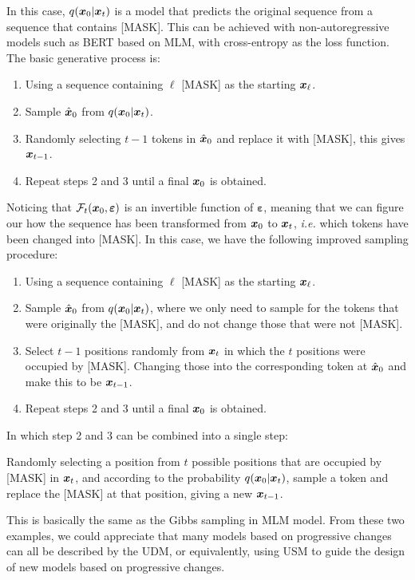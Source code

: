 In this case, $q(\bm{x}_0|\bm{x}_{t})$ is a model that predicts the original sequence from a sequence that contains [MASK]. This can be achieved with non-autoregressive models such as BERT based on MLM, with cross-entropy as the loss function. The basic generative process is:
\begin{myquote}
    \begin{enumerate}
        \item Using a sequence containing $\ell$ [MASK] as the starting $\bm{x}_\ell$.
        \item Sample $\hat{\bm{x}}_0$ from $q(\bm{x}_0|\bm{x}_{t})$.
        \item Randomly selecting $t-1$ tokens in $\hat{\bm{x}}_0$ and replace it with [MASK], this gives $\bm{x}_{t-1}$.
        \item Repeat steps 2 and 3 until a final $\bm{x}_0$ is obtained.
    \end{enumerate}
\end{myquote}

Noticing that $\mathcal{F}_{t}(\bm{x}_0,\bm{\varepsilon})$ is an invertible function of $\bm{\varepsilon}$, meaning that we can figure our how the sequence has been transformed from $\bm{x}_0$ to $\bm{x}_{t}$, \emph{i.e.} which tokens have been changed into [MASK]. In this case, we have the following improved sampling procedure:
\begin{myquote}
    \begin{enumerate}
        \item Using a sequence containing $\ell$ [MASK] as the starting $\bm{x}_\ell$.
        \item Sample $\hat{\bm{x}}_0$ from $q(\bm{x}_0|\bm{x}_{t})$, where we only need to sample for the tokens that were originally the [MASK], and do not change those that were not [MASK].
        \item Select $t-1$ positions randomly from $\bm{x}_{t}$ in which the $t$ positions were occupied by [MASK]. Changing those into the corresponding token at $\hat{\bm{x}}_0$ and make this to be $\bm{x}_{t-1}$.
        \item Repeat steps 2 and 3 until a final $\bm{x}_0$ is obtained.
    \end{enumerate}
\end{myquote}
In which step 2 and 3 can be combined into a single step:
\begin{myquote}
    Randomly selecting a position from $t$ possible positions that are occupied by [MASK] in $\bm{x}_{t}$, and according to the probability $q(\bm{x}_0|\bm{x}_{t})$, sample a token and replace the [MASK] at that position, giving a new $\bm{x}_{t-1}$.
\end{myquote}
This is basically the same as the Gibbs sampling in MLM model. From these two examples, we could appreciate that many models based on progressive changes can all be described by the UDM, or equivalently, using USM to guide the design of new models based on progressive changes.


